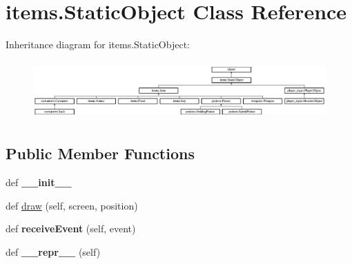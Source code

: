 \hypertarget{classitems_1_1_static_object}{}\section{items.\+Static\+Object Class Reference}
\label{classitems_1_1_static_object}
Inheritance diagram for items.\+Static\+Object\+:\begin{figure}[H]
\begin{center}
\leavevmode
\includegraphics[height=2.259887cm]{classitems_1_1_static_object}
\end{center}
\end{figure}
\subsection*{Public Member Functions}
\begin{DoxyCompactItemize}
\item 
\hypertarget{classitems_1_1_static_object_ac590040611a192bb8a2597e860724edf}{}def {\bfseries \+\_\+\+\_\+init\+\_\+\+\_\+}\label{classitems_1_1_static_object_ac590040611a192bb8a2597e860724edf}

\item 
def \hyperlink{classitems_1_1_static_object_aa7627ab4f30471d813295f3b1eb8bdd2}{draw} (self, screen, position)
\item 
\hypertarget{classitems_1_1_static_object_a0c895afdbd62e6404880cf397c58b48d}{}def {\bfseries receive\+Event} (self, event)\label{classitems_1_1_static_object_a0c895afdbd62e6404880cf397c58b48d}

\item 
\hypertarget{classitems_1_1_static_object_a76bf587a60ab56d4f64504b2573b53d6}{}def {\bfseries \+\_\+\+\_\+repr\+\_\+\+\_\+} (self)\label{classitems_1_1_static_object_a76bf587a60ab56d4f64504b2573b53d6}

\end{DoxyCompactItemize}
